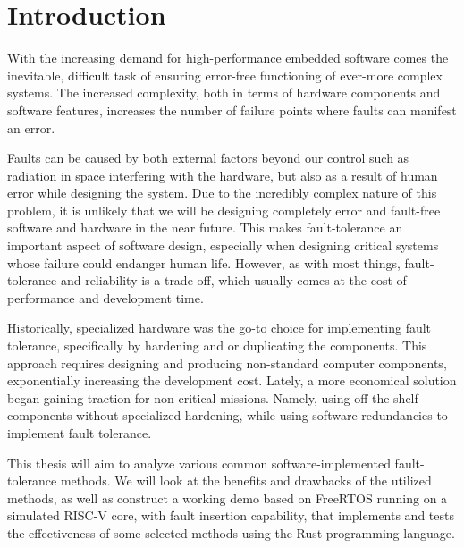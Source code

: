 \section{Introduction}

With the increasing demand for high-performance embedded software comes the inevitable, difficult task of ensuring error-free functioning of ever-more complex systems. The increased complexity, both in terms of hardware components and software features, increases the number of failure points where faults can manifest an error.

Faults can be caused by both external factors beyond our control such as radiation in space interfering with the hardware, but also as a result of human error while designing the system. Due to the incredibly complex nature of this problem, it is unlikely that we will be designing completely error and fault-free software and hardware in the near future. This makes fault-tolerance an important aspect of software design, especially when designing critical systems whose failure could endanger human life. However, as with most things, fault-tolerance and reliability is a trade-off, which usually comes at the cost of performance and development time.

Historically, specialized hardware was the go-to choice for implementing fault tolerance, specifically by hardening and or duplicating the components. This approach requires designing and producing non-standard computer components, exponentially increasing the development cost. Lately, a more economical solution began gaining traction for non-critical missions. Namely, using off-the-shelf components without specialized hardening, while using software redundancies to implement fault tolerance.

This thesis will aim to analyze various common software-implemented fault-tolerance methods. We will look at the benefits and drawbacks of the utilized methods, as well as construct a working demo based on FreeRTOS running on a simulated RISC-V core, with fault insertion capability, that implements and tests the effectiveness of some selected methods using the Rust programming language.
